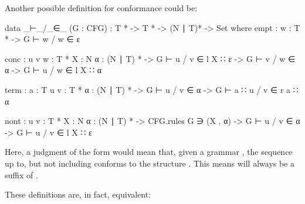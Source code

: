 	Another possible definition for conformance could be: 

	\begin{code}
	
		data _⊢_/_∈_ (G : CFG) : T * -> T * -> (N ∣ T)* -> Set where
		  empt : {w : T *} ->
		    G ⊢ w / w ∈ ε
		
		  conc : {u v w : T *} {X : N} {α : (N ∣ T) *} ->
		    G ⊢ u / v ∈ l X ∷ ε ->
		    G ⊢ v / w ∈ α ->
		      G ⊢ u / w ∈ l X ∷ α
		
		  term : {a : T} {u v : T *} {α : (N ∣ T) *} ->
		    G ⊢ u / v ∈ α ->
		      G ⊢ a ∷ u / v ∈ r a ∷ α
		
		  nont : {u v : T *} {X : N} {α : (N ∣ T) *} ->
		    CFG.rules G ∋ (X , α) ->
		    G ⊢ u / v ∈ α ->
		    G ⊢ u / v ∈ l X ∷ ε

	\end{code}

	Here, a judgment of the form  would mean that, given
	a grammar , the sequence  up to, but not including 
	 conforms to the structure . This means  will
	always be a suffix of .

	These definitions are, in fact, equivalent:

	\begin{code}
	
	\end{code}
